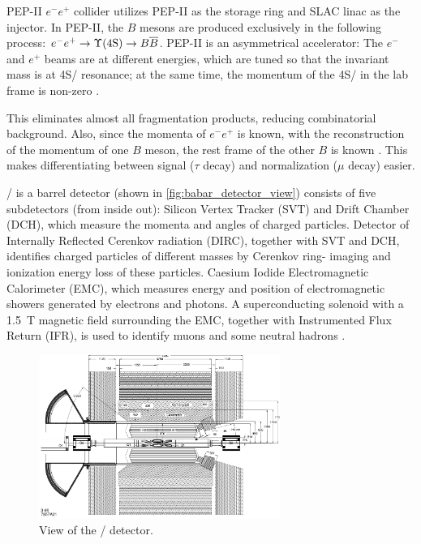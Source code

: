 PEP-II $e^- e^+$ collider utilizes PEP-II as the storage ring and SLAC linac as
the injector.
In PEP-II, the $B$ mesons are produced exclusively in the following process:
$e^- e^+ \rightarrow \Y4S/ \rightarrow B \overline{B}$.
PEP-II is an asymmetrical accelerator: The $e^-$ and $e^+$ beams are at different energies,
which are tuned so that the invariant mass is at \Y4S/ resonance;
at the same time, the momentum of the \Y4S/ in the lab frame is
non-zero \cite{Harrison:1998yr}.

This eliminates almost all fragmentation products, reducing combinatorial
background.
Also, since the momenta of $e^- e^+$ is known, with the reconstruction of the
momentum of one $B$ meson, the rest frame of the other $B$ is
known \cite{Harrison:1998yr}.
This makes differentiating between signal ($\tau$ decay) and normalization
($\mu$ decay) easier.

\BaBar/ is a barrel detector (shown in \autoref{fig:babar_detector_view})
consists of five subdetectors (from inside out):
Silicon Vertex Tracker (SVT) and Drift Chamber (DCH), which measure the momenta
and angles of charged particles.
Detector of Internally Reflected Cerenkov radiation (DIRC), together with SVT
and DCH, identifies charged particles of different masses by Cerenkov ring-
imaging and ionization energy loss of these particles.
Caesium Iodide Electromagnetic Calorimeter (EMC), which measures energy and
position of electromagnetic showers generated by electrons and photons.
A superconducting solenoid with a \SI{1.5}{T} magnetic field surrounding the
EMC, together with Instrumented Flux Return (IFR), is used to identify muons and
some neutral hadrons \cite{Lees:2013uzd}.

\begin{figure}[ht]
    \centering
    \includegraphics[width=0.7\textwidth]{figs/babar_detector_view.pdf}
    \caption{
        View of the \BaBar/ detector.
    }
    \label{fig:babar_detector_view}
\end{figure}


